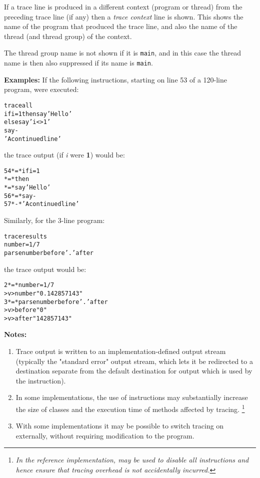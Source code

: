 If a trace line is produced in a different context (program or thread)
from the preceding trace line (if any) then a \emph{trace context}
line is shown.  This shows the name of the program that produced the
trace line, and also the name of the thread (and thread group) of the
context.
 
The thread group name is not shown if it is \texttt{main}, and in this
case the thread name is then also suppressed if its name is \texttt{main}.
 
\textbf{Examples:}
 If the following instructions, starting on line 53 of a 120-line
program, were executed:
\begin{alltt}
trace all
if i=1 then say 'Hello'
       else say 'i<>1'
say -
 'A continued line'
\end{alltt}
the trace output (if \emph{i} were \textbf{1}) would be:
\begin{alltt}
  54 *=* if i=1
     *=*        then
     *=*             say 'Hello'
  56 *=* say -
  57 *-*  'A continued line'
\end{alltt}
 Similarly, for the 3-line program:
\begin{alltt}
trace results
number=1/7
parse number before '.' after
\end{alltt}
the trace output would be:
\begin{alltt}
 2 *=* number=1/7
   >v> number "0.142857143"
 3 *=* parse number before '.' after
   >v> before "0"
   >v> after "142857143"
\end{alltt}
 \textbf{Notes:}
\begin{enumerate}
\item 
Trace output is written to an implementation-defined output stream
(typically the "standard error" output stream, which lets it be
redirected to a destination separate from the default destination for
output which is used by the  instruction).
\item In some implementations, the use of  instructions
may substantially increase the size of classes and the execution time of
methods affected by tracing.
\footnote{
\emph{In the reference implementation,  may be
used to disable all  instructions and hence ensure that
tracing overhead is not accidentally incurred.}
}
\item With some implementations it may be possible to switch tracing on
externally, without requiring modification to the program.
\end{enumerate}
